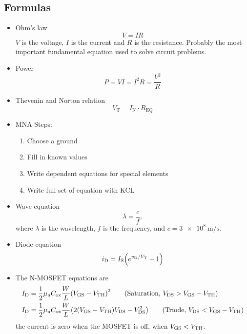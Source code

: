 \subsection*{Formulas}
\begin{itemize}
  \item Ohm's law
  \begin{equation}
    V = IR
    \label{eq:vir}
  \end{equation}
  $V$ is the voltage, $I$ is the current and $R$ is the resistance. Probably
  the most important fundamental equation used to solve circuit problems.

  \item Power
  \begin{equation}
    P = VI = I^2R = \frac{V^2}{R}
  \end{equation}

  \item Thevenin and Norton relation
  \begin{equation}
    V_\text{T} = I_\text{N} \cdot R_\text{EQ}
    \label{eq:thev_nort}
  \end{equation}

  \item MNA Steps:
  \begin{enumerate}
    \item Choose a ground 
    \item Fill in known values 
    \item Write dependent equations for special elements
    \item Write full set of equation with KCL
  \end{enumerate}

  \item Wave equation
  \begin{equation}
    \lambda = \frac{c}{f},
    \label{eq:wave_eq}
  \end{equation}
  where $\lambda$ is the wavelength, $f$ is the frequency,
  and $c = \SI{3e8}{\m/\s}$.

  \item Diode equation
  \begin{equation}
    \iD = \IS \pa{e^{\vD/\VT} - 1}
    \label{eq:diode_eq}
  \end{equation}

  \item The N-MOSFET equations are 
  \begin{align*}
    \ID &= \frac{1}{2}\Kn \pa{\VGS - \VTH}^2 \tag{Saturation, $\VDS > \VGS - \VTH$}\\
    \ID &= \frac{1}{2}\Kn \pa{2\pa{\VGS - \VTH}\VDS - \VDS^2} \tag{Triode, $\VDS < \VGS - \VTH$}
  \end{align*}
  the current is zero when the MOSFET is off, when $V_\text{GS} < V_\text{TH}$.


\end{itemize}
